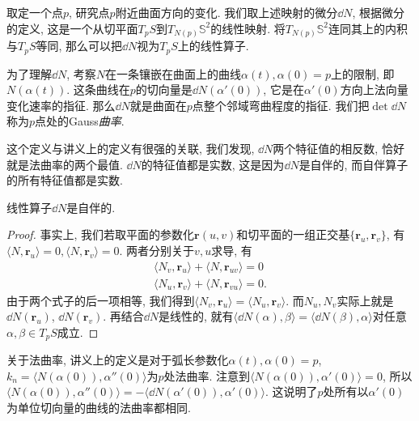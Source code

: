 \documentclass[./main.tex]{subfiles}
\begin{document}
取定一个点\(p\), 研究点\(p\)附近曲面方向的变化. 我们取上述映射的微分\(\dd N\), 根据微分的定义, 这是一个从切平面\(T_{p}S\)到\(T_{N(p)}\mathbb{S}^2\)的线性映射. 将\(T_{N(p)}\mathbb{S}^2\)连同其上的内积与\(T_pS\)等同, 那么可以把\(\dd N\)视为\(T_pS\)上的线性算子.

为了理解\(\dd N\), 考察\(N\)在一条镶嵌在曲面上的曲线\(\alpha(t),\alpha(0)=p\)上的限制, 即\(N(\alpha(t))\). 这条曲线在\(p\)的切向量是\(\dd N(\alpha'(0))\), 它是在\(\alpha'(0)\)方向上法向量变化速率的指征. 那么\(\dd N\)就是曲面在\(p\)点整个邻域弯曲程度的指征. 我们把\(\det\dd N\)称为\(p\)点处的Gauss\textit{曲率}.

这个定义与讲义上的定义有很强的关联, 我们发现, \(\dd N\)两个特征值的相反数, 恰好就是法曲率的两个最值. \(\dd N\)的特征值都是实数, 这是因为\(\dd N\)是自伴的, 而自伴算子的所有特征值都是实数.
\begin{proposition}
    线性算子\(\dd N\)是自伴的.
\end{proposition}
\begin{proof}
事实上, 我们若取平面的参数化\(\mathbf{r}(u,v)\)和切平面的一组正交基\(\{\mathbf{r}_u,\mathbf{r}_v\}\), 有\(\langle N,\mathbf{r}_u\rangle=0,\langle N,\mathbf{r}_v\rangle=0\). 两者分别关于\(v,u\)求导, 有
\begin{gather*}
    \langle N_v,\mathbf{r}_u\rangle+\langle N,\mathbf{r}_{uv}\rangle=0\\
    \langle N_u,\mathbf{r}_v\rangle+\langle N,\mathbf{r}_{vu}\rangle=0.
\end{gather*}
由于两个式子的后一项相等, 我们得到\(\langle N_v,\mathbf{r}_u\rangle=\langle N_u,\mathbf{r}_v\rangle\). 而\(N_u,N_v\)实际上就是\(\dd N(\mathbf{r}_u)\), \(\dd N(\mathbf{r}_v)\). 再结合\(\dd N\)是线性的, 就有\(\langle \dd N(\alpha),\beta\rangle=\langle\dd N(\beta),\alpha\rangle\)对任意\(\alpha,\beta\in T_pS\)成立.
\end{proof}

关于法曲率, 讲义上的定义是对于弧长参数化\(\alpha(t),\alpha(0)=p\), \(k_n=\langle N(\alpha(0)),\alpha''(0)\rangle\)为\(p\)处法曲率. 注意到\(\langle N(\alpha(0)),\alpha'(0)\rangle=0\), 所以\(\langle N(\alpha(0)),\alpha''(0)\rangle=-\langle \dd N(\alpha'(0)),\alpha'(0)\rangle\). 这说明了\(p\)处所有以\(\alpha'(0)\)为单位切向量的曲线的法曲率都相同.
\end{document}
